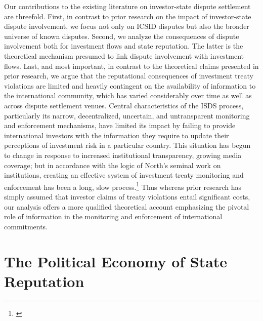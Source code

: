 \documentclass[12pt,onesided]{amsart}
\begin{document}
Our contributions to the existing literature on investor-state dispute settlement are threefold. First, in contrast to prior research on the impact of investor-state dispute involvement, we focus not only on ICSID disputes but also the broader universe of known disputes. Second, we analyze the consequences of dispute involvement both for investment flows and state reputation. The latter is the theoretical mechanism presumed to link dispute involvement with investment flows. Last, and most important, in contrast to the theoretical claims presented in prior research, we argue that the reputational consequences of investment treaty violations are limited and heavily contingent on the availability of information to the international community, which has varied considerably over time as well as across dispute settlement venues. Central characteristics of the ISDS process, particularly its narrow, decentralized, uncertain, and untransparent monitoring and enforcement mechanisms, have limited its impact by failing to provide international investors with the information they require to update their perceptions of investment risk in a particular country. This situation has begun to change in response to increased institutional transparency, growing media coverage; but in accordance with the logic of North's seminal work on institutions, creating an effective system of investment treaty monitoring and enforcement has been a long, slow process.\footnote{\citet[p. 60]{north1990institutions}} Thus whereas prior research has simply assumed that investor claims of treaty violations entail significant costs, our analysis offers a more qualified theoretical account emphasizing the pivotal role of information in the monitoring and enforcement of international commitments.

\section*{The Political Economy of State Reputation}
\end{document}
